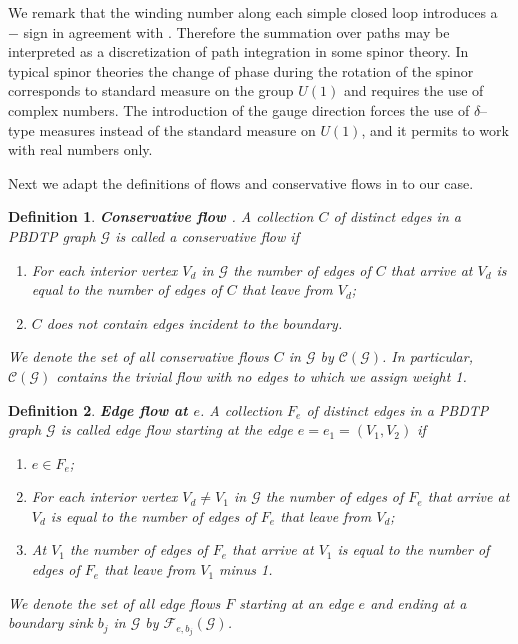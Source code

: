 \documentclass[11pt]{amsart}
\theoremstyle{plain}
\numberwithin{equation}{section}
\newtheorem{definition}{Definition}[subsection]
\begin{document}
We remark that the winding number along each simple closed loop introduces a $-$ sign in agreement with \cite{Pos}. Therefore the summation over paths may be interpreted as a discretization of path integration in some spinor theory. In typical spinor theories the change of phase during the rotation of the spinor corresponds to standard measure on the group $U(1)$ and requires the use of complex numbers. The introduction of the gauge direction forces the use of $\delta$--type measures instead of the standard measure on $U(1)$, and it permits to work with real numbers only.

Next we adapt the definitions of flows and conservative flows in \cite{Tal2} to our case.

\begin{definition}\label{def:cons_flow}\textbf{Conservative flow \cite{Tal2}}. A collection $C$ of distinct edges in a PBDTP graph $\mathcal G$ is called a conservative flow if 
\begin{enumerate}
\item For each interior vertex $V_d$ in $\mathcal G$ the number of edges of $C$ that arrive at $V_d$ is equal to the number of edges of $C$ that leave from $V_d$;
\item $C$ does not contain edges incident to the boundary.
\end{enumerate}
We denote the set of all conservative flows $C$ in $\mathcal G$  by ${\mathcal C}(\mathcal G)$. In particular, ${\mathcal C}(\mathcal G)$ contains the trivial flow with no edges to which we assign weight 1.
\end{definition}

\begin{definition}\label{def:edge_flow}\textbf{Edge flow at $e$}. A collection $F_e$ of distinct edges in a PBDTP graph $\mathcal G$ is called edge flow starting at the edge $e=e_1=(V_1,V_2)$ if 
\begin{enumerate}
\item $e\in F_e$;
\item For each interior vertex $V_d\ne V_1$ in $\mathcal G$ the number of edges of $F_e$ that arrive at $V_d$ is equal to the number of edges of $F_e$ that leave from $V_d$;
\item At $V_1$ the number of edges of $F_e$ that arrive at $V_1$ is equal to the number of edges of $F_e$ that leave from $V_1$ minus 1.
\end{enumerate}
We denote the set of all edge flows $F$ starting at an edge $e$ and ending at a boundary sink $b_j$ in $\mathcal G$ by ${\mathcal F}_{e,b_j}(\mathcal G)$.
\end{definition}
\end{document}
